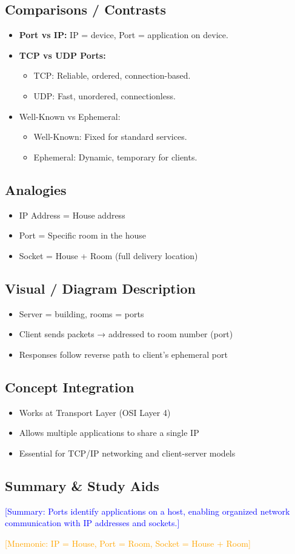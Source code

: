 \documentclass[12pt]{article}
\begin{document}
\subsection{Comparisons / Contrasts}
\begin{itemize}
    \item \textbf{Port vs IP:} IP = device, Port = application on device.
    \item \textbf{TCP vs UDP Ports:}
          \begin{itemize}
              \item TCP: Reliable, ordered, connection-based.
              \item UDP: Fast, unordered, connectionless.
          \end{itemize}
    \item Well-Known vs Ephemeral:
          \begin{itemize}
              \item Well-Known: Fixed for standard services.
              \item Ephemeral: Dynamic, temporary for clients.
          \end{itemize}
\end{itemize}

\subsection{Analogies}
\begin{itemize}
    \item IP Address = House address
    \item Port = Specific room in the house
    \item Socket = House + Room (full delivery location)
\end{itemize}

\subsection{Visual / Diagram Description}
\begin{itemize}
    \item Server = building, rooms = ports
    \item Client sends packets → addressed to room number (port)
    \item Responses follow reverse path to client's ephemeral port
\end{itemize}

\subsection{Concept Integration}
\begin{itemize}
    \item Works at Transport Layer (OSI Layer 4)
    \item Allows multiple applications to share a single IP
    \item Essential for TCP/IP networking and client-server models
\end{itemize}

\subsection{Summary \& Study Aids}
\textcolor{blue}{[Summary: Ports identify applications on a host, enabling organized network communication with IP addresses and sockets.]}

\textcolor{orange}{[Mnemonic: IP = House, Port = Room, Socket = House + Room]}
\end{document}
